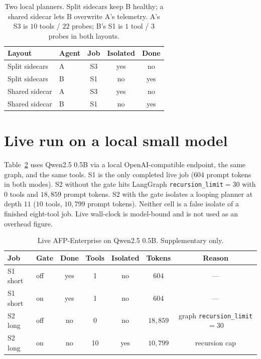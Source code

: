 \documentclass[11pt,a4paper]{article}
\begin{document}
\begin{table}[htbp]
\centering
\caption{Two local planners. Split sidecars keep B healthy; a shared sidecar lets B overwrite A's telemetry. A's S3 is $10$ tools / $22$ probes; B's S1 is $1$ tool / $3$ probes in both layouts.}
\label{tab:two}
\begin{tabular}{@{}llccc@{}}
\toprule
Layout & Agent & Job & Isolated & Done \\
\midrule
Split sidecars & A & S3 & yes & no \\
Split sidecars & B & S1 & no & yes \\
Shared sidecar & A & S3 & yes & no \\
Shared sidecar & B & S1 & no & yes \\
\bottomrule
\end{tabular}
\end{table}

\section{Live run on a local small model}
\label{app:live}

Table~\ref{tab:live} uses Qwen2.5 0.5B via a local OpenAI-compatible endpoint, the same graph, and the same tools.
S1 is the only completed live job ($604$ prompt tokens in both modes).
S2 without the gate hits LangGraph \texttt{recursion\_limit}$=30$ with $0$ tools and $18{,}859$ prompt tokens.
S2 with the gate isolates a looping planner at depth $11$ ($10$ tools, $10{,}799$ prompt tokens).
Neither cell is a false isolate of a finished eight-tool job.
Live wall-clock is model-bound and is not used as an overhead figure.

\begin{table}[htbp]
\centering
\caption{Live AFP-Enterprise on Qwen2.5 0.5B. Supplementary only.}
\label{tab:live}
{\small
\begin{tabular}{@{}llccccc@{}}
\toprule
Job & Gate & Done & Tools & Isolated & Tokens & Reason \\
\midrule
S1 short & off & yes & 1 & no & $604$ & --- \\
S1 short & on & yes & 1 & no & $604$ & --- \\
S2 long & off & no & 0 & no & $18{,}859$ & graph \texttt{recursion\_limit}$=30$ \\
S2 long & on & no & 10 & yes & $10{,}799$ & recursion cap \\
\bottomrule
\end{tabular}
}
\end{table}
\end{document}
